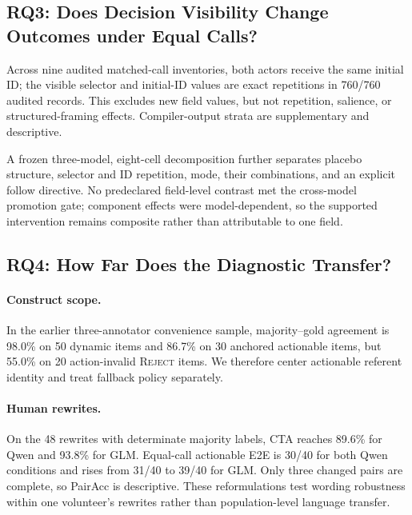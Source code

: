 \documentclass[letterpaper]{article}
\begin{document}
\subsection{RQ3: Does Decision Visibility Change Outcomes under Equal Calls?}
%

Across nine audited matched-call inventories, both actors receive the same initial ID; the visible
selector and initial-ID values are exact repetitions in 760/760 audited records. This excludes new field values,
but not repetition, salience, or structured-framing effects. Compiler-output strata are
supplementary and descriptive.

A frozen three-model, eight-cell decomposition further separates placebo structure, selector and
ID repetition, mode, their combinations, and an explicit follow directive. No predeclared
field-level contrast met the cross-model promotion gate; component effects were model-dependent,
so the supported intervention remains composite rather than attributable to one field.

\subsection{RQ4: How Far Does the Diagnostic Transfer?}

\paragraph{Construct scope.}
In the earlier three-annotator convenience sample, majority--gold agreement is 98.0\% on 50 dynamic
items and 86.7\% on 30 anchored actionable items, but 55.0\% on 20 action-invalid \textsc{Reject}
items. We therefore center actionable referent identity and treat fallback policy separately.

\paragraph{Human rewrites.}
On the 48 rewrites with determinate majority labels, CTA reaches 89.6\% for Qwen and 93.8\% for GLM.
Equal-call actionable E2E is 30/40 for both Qwen conditions and rises from 31/40 to 39/40 for GLM.
Only three changed pairs are complete, so PairAcc is descriptive. These reformulations test wording
robustness within one volunteer's rewrites rather than population-level language transfer.
\end{document}
